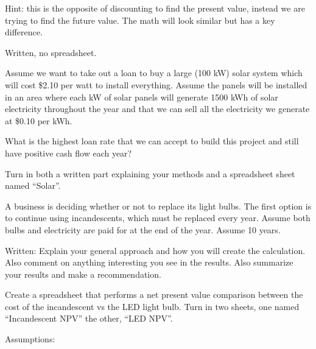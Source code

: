 \documentclass{article}
\begin{document}
Hint: this is the opposite of discounting to find the present value,
instead we are trying to find the future value.  The math will look
similar but has a key difference.

Written, no spreadsheet.

Assume we want to take out a loan to buy a large (100 kW) solar system which will
cost \$2.10 per watt to install everything.  Assume the panels will be
installed in an area where each kW of solar panels will generate 1500
kWh of solar electricity throughout the year and that we can sell all
the electricity we generate at \$0.10 per kWh.

What is the highest loan rate that we can accept to build this project
and still have positive cash flow each year?

Turn in both a written part explaining your methods and a spreadsheet
sheet named ``Solar''.




A business is deciding whether or not to replace its light bulbs.  The
first option is to continue using incandescents, which must be replaced
every year.  Assume both bulbs and electricity are paid for at the
end of the year.  Assume 10 years.

Written: Explain your general approach and how you will create the
calculation.  Also comment on anything interesting you see in the
results.  Also summarize your results and make a recommendation.

Create a spreadsheet that performs a net present value comparison
between the cost of the incandescent vs the LED light bulb.  Turn in two
sheets, one named ``Incandescent NPV'' the other, ``LED NPV''.

Assumptions:
\end{document}
